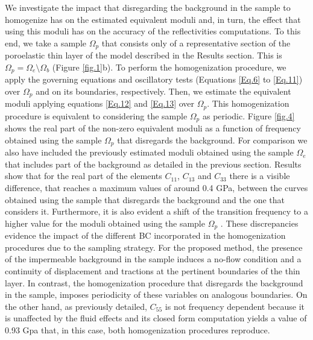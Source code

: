 \documentclass[draft]{agujournal2019}
\begin{document}
We investigate the impact that disregarding the background in the sample to homogenize has on the estimated equivalent moduli and, in turn, the effect that using this moduli has on the accuracy of the reflectivities computations. To this end, we take a sample $\Omega_p$ that consists only of a representative section of the poroelastic thin layer of the model described in the Results section.
This is $\Omega_p = \Omega_e  \setminus \Omega_b $ (Figure \ref{fig.1}b). To perform the homogenization procedure, we apply the governing equations and oscillatory tests (Equations \eqref{Eq.6} to \eqref{Eq.11}) over $\Omega_p$ and on its boundaries, respectively. Then, we estimate the equivalent moduli applying equations \eqref{Eq.12} and \eqref{Eq.13} over $\Omega_p$.
This homogenization procedure is equivalent to considering the sample $\Omega_p$ as periodic. 
Figure \ref{fig.4} shows the real part of the non-zero equivalent moduli as a function of frequency obtained using the sample $\Omega_p$ that disregards the background. For comparison we also have included the previously estimated moduli obtained using the sample $\Omega_e$  that includes part of the background as detailed in the previous section. Results show that for the real part of the elements $C_{11}$, $C_{13}$ and $C_{33}$ there is a visible difference, that reaches a maximum values of around 0.4 GPa, between the curves obtained using the sample that disregards the background and the one that considers it. Furthermore, it is also evident a shift of the transition frequency to a higher value for the moduli obtained using the sample $\Omega_p$ . These discrepancies evidence the impact of the different BC incorporated in the homogenization procedures due to the sampling strategy. For the proposed method, the presence of the impermeable background in the sample induces a no-flow condition and a continuity  of displacement and tractions at the pertinent boundaries of the thin layer. In contrast, the homogenization procedure that disregards the background in the sample, imposes periodicity of these variables on analogous boundaries. On the other hand, as previously detailed, $C_{55}$ is not frequency dependent because it is unaffected by the fluid effects and its closed form computation yields a value of 0.93 Gpa that, in this case, both homogenization procedures reproduce.
\end{document}
